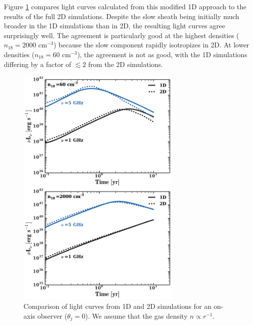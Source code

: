 \documentclass[usenatbib,fleqn]{mnras}
\begin{document}
Figure \ref{fig:1D2DB} compares light curves calculated from this
modified 1D approach to the results of the full 2D simulations.
Despite the slow sheath being initially much broader in the 1D
simulations than in 2D, the resulting light curves agree surprisingly
well.  The agreement is particularly good at the highest densities
($n_{18}=2000$ cm$^{-3}$) because the slow component rapidly
isotropizes in 2D.  At lower densities ($n_{18}=60$ cm$^{-3}$), the
agreement is not as good, with the 1D simulations differing by a
factor of $\lesssim 2$ from the 2D simulations.


\begin{figure}
\includegraphics[width=8cm]{1d_2d.pdf}
\caption{\label{fig:1D2DB} Comparison of light curves from 1D and 2D
  simulations for an on-axis observer ($\theta_{j} = 0$). We
  assume that the gas density $n\propto r^{-1}$.}
\end{figure}
\end{document}
